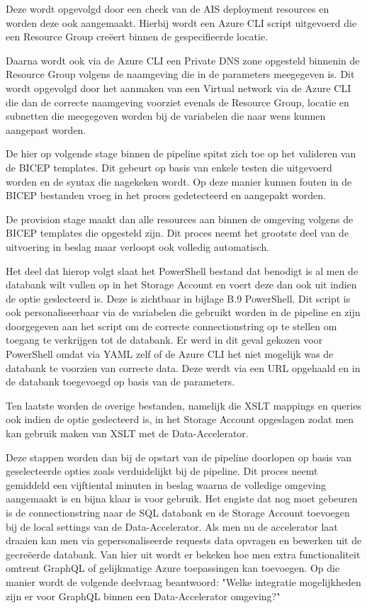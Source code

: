 Deze wordt opgevolgd door een check  van de AIS deployment resources en worden deze ook aangemaakt. Hierbij wordt een Azure CLI script uitgevoerd die een Resource Group creëert binnen de gespecifieerde locatie.

Daarna wordt ook via de Azure CLI een Private DNS zone opgesteld binnenin de Resource Group volgens de naamgeving die in de parameters meegegeven is. Dit wordt opgevolgd door het aanmaken van een Virtual network via de Azure CLI die dan de correcte naamgeving voorziet evenals de Resource Group, locatie en subnetten die meegegeven worden bij de variabelen die naar wens kunnen aangepast worden.

De hier op volgende stage binnen de pipeline spitst zich toe op het valideren van de BICEP templates. Dit gebeurt op basis van enkele testen die uitgevoerd worden en de syntax die nagekeken wordt. Op deze manier kunnen fouten in de BICEP bestanden vroeg in het proces gedetecteerd en aangepakt worden.

De provision stage maakt dan alle resources aan binnen de omgeving volgens de BICEP templates die opgesteld zijn. Dit proces neemt het grootste deel van de uitvoering in beslag maar verloopt ook volledig automatisch.

Het deel dat hierop volgt slaat het PowerShell bestand dat benodigt is al men de databank wilt vullen op in het Storage Account en voert deze dan ook uit indien de optie geslecteerd is. Deze is zichtbaar in bijlage B.9 PowerShell. Dit script is ook personaliseerbaar via de variabelen die gebruikt worden in de pipeline en zijn doorgegeven aan het script om de correcte connectionstring op te stellen om toegang te verkrijgen tot de databank. Er werd in dit geval gekozen voor PowerShell omdat via YAML zelf of de Azure CLI het niet mogelijk was de databank te voorzien van correcte data. Deze werdt via een URL opgehaald en in de databank toegevoegd op basis van de parameters.

Ten laatste worden de overige bestanden, namelijk die XSLT mappings en queries ook indien de optie geslecteerd is, in het Storage Account opgeslagen zodat men kan gebruik maken van XSLT met de Data-Accelerator.

Deze stappen worden dan bij de opstart van de pipeline doorlopen op basis van geselecteerde opties zoals verduidelijkt bij de pipeline. Dit proces neemt gemiddeld een vijftiental minuten in beslag waarna de volledige omgeving aangemaakt is en bijna klaar is voor gebruik.
Het engiste dat nog moet gebeuren is de connectionstring naar de SQL databank en de Storage Account toevoegen bij de local settings van de Data-Accelerator. Als men nu de accelerator laat draaien kan men via gepersonaliseerde requests data opvragen en bewerken uit de gecreëerde databank. Van hier uit wordt er bekeken hoe men extra functionaliteit omtrent GraphQL of gelijkmatige Azure toepassingen kan toevoegen. Op die manier wordt de volgende deelvraag beantwoord: "Welke integratie mogelijkheden zijn er voor GraphQL binnen een Data-Accelerator omgeving?"

